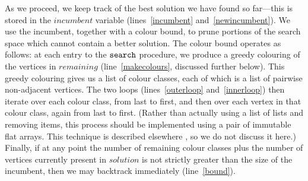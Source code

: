 \documentclass{llncs}
\newcommand{\lineref}[1]{line~\ref{#1}}
\newcommand{\twolinesref}[2]{lines~\ref{#1} and~\ref{#2}}
\begin{document}
As we proceed, we keep track of the best solution we have found so far---this is stored in the
$\mathit{incumbent}$ variable (\twolinesref{incumbent}{newincumbent}). We use the incumbent,
together with a colour bound, to prune portions of the search space which cannot contain a better
solution. The colour bound operates as follows: at each entry to the $\FuncSty{search}$ procedure,
we produce a greedy colouring of the vertices in $\mathit{remaining}$ (\lineref{makecolours},
discussed further below). This greedy colouring gives us a list of colour classes, each of which is
a list of pairwise non-adjacent vertices. The two loops (\twolinesref{outerloop}{innerloop}) then
iterate over each colour class, from last to first, and then over each vertex in that colour class,
again from last to first.  (Rather than actually using a list of lists and removing items, this
process should be implemented using a pair of immutable flat arrays. This technique is described
elsewhere \cite{DBLP:conf/cp/McCreeshP14}, so we do not discuss it here.) Finally, if at any point
the number of remaining colour classes plus the number of vertices currently present in
$\mathit{solution}$ is not strictly greater than the size of the incumbent, then we may backtrack
immediately (\lineref{bound}).
\end{document}
